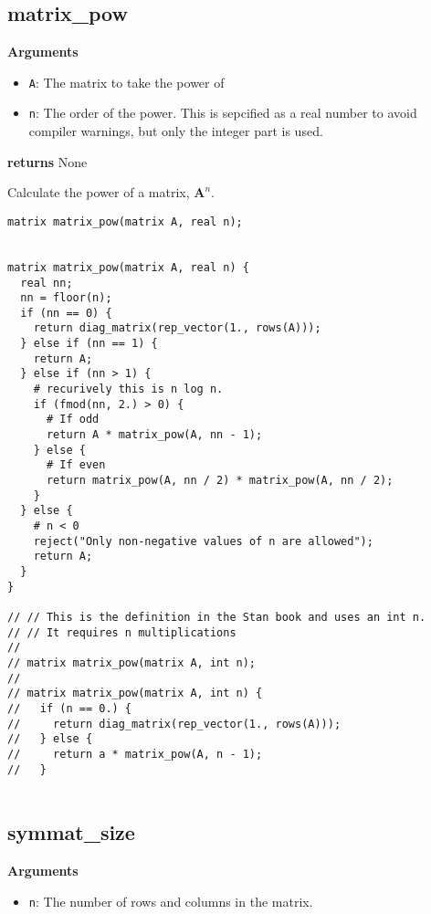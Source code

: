 \documentclass[]{book}
\providecommand{\tightlist}{%
  \setlength{\itemsep}{0pt}\setlength{\parskip}{0pt}}
\newcommand{\mat}[1]{\boldsymbol{#1}}
\begin{document}
\subsection{matrix\_pow}\label{matrix_pow}

\textbf{Arguments}

\begin{itemize}
\tightlist
\item
  \texttt{A}: The matrix to take the power of
\item
  \texttt{n}: The order of the power. This is sepcified as a real number
  to avoid compiler warnings, but only the integer part is used.
\end{itemize}

\textbf{returns} None

Calculate the power of a matrix, \(\mat{A}^n\).

\begin{verbatim}
matrix matrix_pow(matrix A, real n);


matrix matrix_pow(matrix A, real n) {
  real nn;
  nn = floor(n);
  if (nn == 0) {
    return diag_matrix(rep_vector(1., rows(A)));
  } else if (nn == 1) {
    return A;
  } else if (nn > 1) {
    # recurively this is n log n.
    if (fmod(nn, 2.) > 0) {
      # If odd
      return A * matrix_pow(A, nn - 1);
    } else {
      # If even
      return matrix_pow(A, nn / 2) * matrix_pow(A, nn / 2);
    }
  } else {
    # n < 0
    reject("Only non-negative values of n are allowed");
    return A;
  }
}

// // This is the definition in the Stan book and uses an int n.
// // It requires n multiplications
//
// matrix matrix_pow(matrix A, int n);
//
// matrix matrix_pow(matrix A, int n) {
//   if (n == 0.) {
//     return diag_matrix(rep_vector(1., rows(A)));
//   } else {
//     return a * matrix_pow(A, n - 1);
//   }


\end{verbatim}

\subsection{symmat\_size}\label{symmat_size}

\textbf{Arguments}

\begin{itemize}
\tightlist
\item
  \texttt{n}: The number of rows and columns in the matrix.
\end{itemize}
\end{document}
